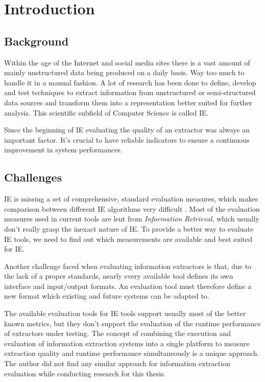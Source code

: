 \section{Introduction}

\subsection{Background}
Within the age of the Internet and social media sites there is a vast amount of mainly unstructured data being produced on a daily basis. Way too much to handle it in a manual fashion. A lot of research has been done to define, develop and test techniques to extract information from unstructured or semi-structured data sources and transform them into a representation better suited for further analysis. This scientific subfield of Computer Science is called \gls{IE}.

Since the beginning of \gls{IE} evaluating the quality of an extractor was always an important factor. It's crucial to have reliable indicators to ensure a continuous improvement in system performances.

\subsection{Challenges}
\gls{IE} is missing a set of comprehensive, standard evaluation measures, which makes comparison between different IE algorithms very difficult \cite{Sitter:2004}. Most of the evaluation measures used in current tools are lent from \textit{Information Retrieval}, which usually don't really grasp the inexact nature of \gls{IE}. To provide a better way to evaluate \gls{IE} tools, we need to find out which measurements are available and best suited for \gls{IE}.

Another challenge faced when evaluating information extractors is that, due to the lack of a proper standards, nearly every available tool defines its own interface and input/output formats. An evaluation tool must therefore define a new format which existing and future systems can be adapted to.

The available evaluation tools for \gls{IE} tools support usually most of the better known metrics, but they don't support the evaluation of the runtime performance of extractors under testing. The concept of combining the execution and evaluation of information extraction systems into a single platform to measure extraction quality and runtime performance simultaneously is a unique approach. The author did not find any similar approach for information extraction evaluation while conducting research for this thesis.

